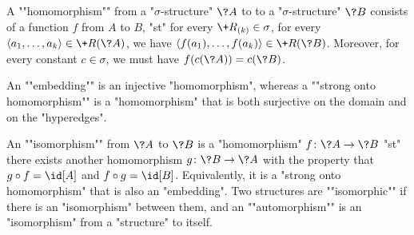 A \AP""homomorphism"" from a "$\sigma$-structure" $\?A$ to
to a "$\sigma$-structure" $\?B$ consists of a function $f$ from $A$ to $B$,
"st" for every $\+R_{(k)} \in \sigma$, for every $\tup{a_1,\dotsc,a_k} \in \+R(\?A)$,
we have $\tup{f(a_1), \dotsc, f(a_k)} \in \+R(\?B)$. Moreover, for every
constant $c \in \sigma$, we must have $f(c(\?A)) = c(\?B)$.

An \AP""embedding"" is an injective "homomorphism",
whereas a \AP""strong onto homomorphism"" is a "homomorphism" that is both
surjective on the domain and on the "hyperedges". 

An \AP""isomorphism"" from $\?A$ to $\?B$ is a "homomorphism" $f\colon \?A \to \?B$
"st" there exists another homomorphism $g\colon \?B \to \?A$ with the property
that $g \circ f = \id[A]$ and $f \circ g = \id[B]$. Equivalently,
it is a "strong onto homomorphism" that is also an "embedding".
Two structures are \AP""isomorphic"" if there is an "isomorphism" between them,
and an ""automorphism"" is an "isomorphism" from a "structure" to itself.

